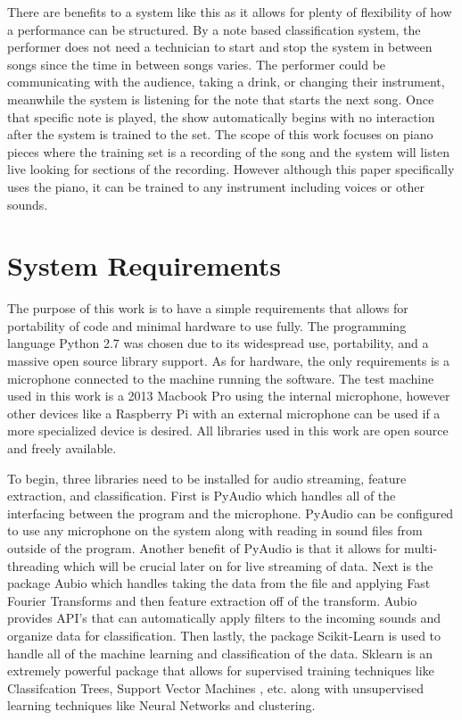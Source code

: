 \documentclass[conference]{IEEEtran}
\begin{document}
There are benefits to a system like this as it allows for plenty of flexibility of how a performance can be structured.  By a note based classification system, the performer does not need a technician to start and stop the system in between songs since the time in between songs varies.  The performer could be communicating with the audience, taking a drink, or changing their instrument, meanwhile the system is listening for the note that starts the next song.  Once that specific note is played, the show automatically begins with no interaction after the system is trained to the set.  The scope of this work focuses on piano pieces where the training set is a recording of the song and the system will listen live looking for sections of the recording.  However although this paper specifically uses the piano, it can be trained to any instrument including voices or other sounds.

\section{System Requirements}
\label{sec:arch}
The purpose of this work is to have a simple requirements that allows for portability of code and minimal hardware to use fully.  The programming language Python 2.7 was chosen due to its widespread use, portability, and a massive open source library support.  As for hardware, the only requirements is a microphone connected to the machine running the software.  The test machine used in this work is a 2013 Macbook Pro using the internal microphone, however other devices like a Raspberry Pi with an external microphone can be used if a more specialized device is desired.   All libraries used in this work are open source and freely available.

To begin, three libraries need to be installed for audio streaming, feature extraction, and classification.  First is PyAudio which handles all of the interfacing between the program and the microphone.  PyAudio can be configured to use any microphone on the system along with reading in sound files from outside of the program.  Another benefit of PyAudio is that it allows for multi-threading which will be crucial later on for live streaming of data.  Next is the package Aubio which handles taking the data from the file and applying Fast Fourier Transforms and then feature extraction off of the transform.  Aubio provides API's that can automatically apply filters to the incoming sounds and organize data for classification.  Then lastly, the package Scikit-Learn is used to handle all of the machine learning and classification of the data.  Sklearn is an extremely powerful package that allows for supervised training techniques like Classifcation Trees, Support Vector Machines , etc. along with unsupervised learning techniques like Neural Networks and clustering.  
\end{document}
